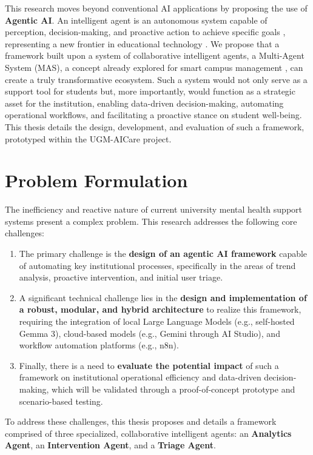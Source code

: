 This research moves beyond conventional AI applications by proposing the use of \textbf{Agentic AI}. An intelligent agent is an autonomous system capable of perception, decision-making, and proactive action to achieve specific goals \cite{FIND_CITATION_PLEASE}, representing a new frontier in educational technology \cite{FIND_CITATION_PLEASE}. We propose that a framework built upon a system of collaborative intelligent agents, a Multi-Agent System (MAS), a concept already explored for smart campus management \cite{FIND_CITATION_PLEASE}, can create a truly transformative ecosystem. Such a system would not only serve as a support tool for students but, more importantly, would function as a strategic asset for the institution, enabling data-driven decision-making, automating operational workflows, and facilitating a proactive stance on student well-being. This thesis details the design, development, and evaluation of such a framework, prototyped within the UGM-AICare project.



\section{Problem Formulation}
\label{sec:problem_formulation}

The inefficiency and reactive nature of current university mental health support systems present a complex problem. This research addresses the following core challenges:

\begin{enumerate}
    \item The primary challenge is the \textbf{design of an agentic AI framework} capable of automating key institutional processes, specifically in the areas of trend analysis, proactive intervention, and initial user triage.
    \item A significant technical challenge lies in the \textbf{design and implementation of a robust, modular, and hybrid architecture} to realize this framework, requiring the integration of local Large Language Models (e.g., self-hosted Gemma 3), cloud-based models (e.g., Gemini through AI Studio), and workflow automation platforms (e.g., n8n).
    \item Finally, there is a need to \textbf{evaluate the potential impact} of such a framework on institutional operational efficiency and data-driven decision-making, which will be validated through a proof-of-concept prototype and scenario-based testing.
\end{enumerate}
To address these challenges, this thesis proposes and details a framework comprised of three specialized, collaborative intelligent agents: an \textbf{Analytics Agent}, an \textbf{Intervention Agent}, and a \textbf{Triage Agent}.

